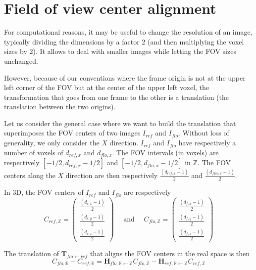 \section{Field of view center alignment}
\label{sec:field:view:center:alignment}


For computational reasons, it may be useful to change the resolution of an image, typically dividing the dimensions by a factor 2 (and then multiplying the voxel sizes by 2). It allows to deal with smaller images while letting the FOV sizes unchanged.

However, because of our conventions where the frame origin is not at the upper left corner of the FOV but at the center of the upper left voxel, the transformation that goes from one frame to the other is a translation (the translation between the two origins).

Let us consider the general case where we want to build the translation that superimposes the FOV centers of two images $I_{ref}$ and $I_{flo}$. Without loss of generality, we only consider the $X$ direction. $I_{ref}$ and $I_{flo}$ have respectively a number of voxels of $d_{ref,x}$ and $d_{flo,x}$. The FOV intervals (in voxels) are respectively 
$[-1/2, d_{ref,x} - 1/2]$ and
$[-1/2, d_{flo,x} - 1/2]$ in $\mathbb{Z}$. The FOV centers along the $X$ direction are then respectively $\frac{(d_{ref,x}-1)}{2}$ and $\frac{(d_{fflo,x}-1)}{2}$. 

In 3D, the FOV centers of $I_{ref}$ and $I_{flo}$ are respectively
\begin{displaymath}
C_{ref,\mathbb{Z}} = 
\left(
\begin{array}{c}
\frac{(d_{r,x}-1)}{2} \\
\frac{(d_{r,y}-1)}{2} \\
\frac{(d_{r,z}-1)}{2}
\end{array}
\right)
\quad \textrm{ and } \quad
C_{flo,\mathbb{Z}} = 
\left(
\begin{array}{c}
\frac{(d_{f,x}-1)}{2} \\
\frac{(d_{f,y}-1)}{2} \\
\frac{(d_{f,z}-1)}{2}
\end{array}
\right)
\end{displaymath}


The translation of $\mathbf{T}_{flo \leftarrow ref}$ that aligns the FOV centers in the real space is then
\begin{displaymath}
C_{flo,\mathbb{R}} - C_{ref,\mathbb{R}}
= \mathbf{H}_{flo,\mathbb{R} \leftarrow \mathbb{Z}} C_{flo,\mathbb{Z}}
- \mathbf{H}_{ref,\mathbb{R} \leftarrow \mathbb{Z}} C_{ref,\mathbb{Z}}
\end{displaymath}


